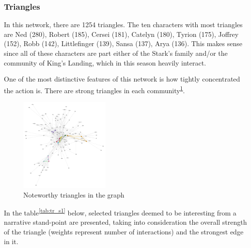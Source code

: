 \documentclass[10pt,twocolumn,letterpaper]{article}
\begin{document}
\subsubsection{Triangles}

In this network, there are 1254 triangles. The ten characters with most triangles are
Ned (280), Robert (185), Cersei (181), Catelyn	(180), Tyrion (175), Joffrey (152), Robb (142), Littlefinger (139), Sansa (137), Arya (136). This makes sense since all of these characters are part either of the Stark's family and/or the community of King's Landing, which in this season heavily interact.

One of the most distinctive features of this network is how tightly concentrated the action is. There are strong triangles in each community\textsuperscript{\ref{fig:tr_s1}}.

\begin{figure}[!h]
    \centering
    \includegraphics[width=0.4\textwidth]{img/s1/s1_triangles.jpg}
    \caption{\small{Noteworthy triangles in the graph}}
    \label{fig:tr_s1}
\end{figure}

In the table\textsuperscript{\ref{tab:tr_s1}} below, selected triangles deemed to be interesting from a narrative stand-point are presented, taking into consideration the overall strength of the triangle (weights represent number of interactions) and the strongest edge in it. 
\end{document}
